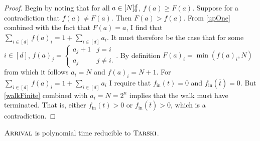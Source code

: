   \begin{proof}
    Begin by noting that for all $a \in [N]_0^d$, $f(a) \geq F(a)$. Suppose for a contradiction that $f(a) \neq F(a)$.
    Then $F(a) > f(a)$. From \cref{upOne} combined with the fact that $F(a) = a$, I find that 
    $\sum_{i \in [d]} f(a)_i = 1 + \sum_{i \in [d]} a_i$. 
    It must therefore be the case that for some $i \in [d]$, $f(a)_j = 
    \begin{cases} a_j + 1 & j = i \\ a_j & j \neq i. \end{cases}$. By definition $F(a)_i = \min(f(a)_i, N)$
      from which it follows $a_i = N$ and $f(a)_i = N + 1$.
    For $\sum_{i \in [d]} f(a)_i = 1 + \sum_{i \in [d]} a_i$ I require that $f_{\text{in}}(t) = 0$ and $f_{\text{in}}(\overline{t}) = 0$.
    But \cref{walkFinite} combined with $a_i = N = 2^n$ implies that the walk must have terminated. That is,
    either $f_{\text{in}}(t) > 0$ or $f_{\text{in}}(\overline{t}) > 0$, which is a contradiction. 
  \end{proof}
  \begin{theorem}
    $\textsc{Arrival}$ is polynomial time reducible to $\textsc{Tarski}$.
  \end{theorem}
